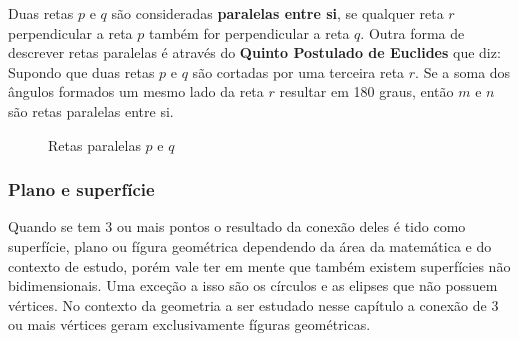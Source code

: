\begin{multicols*}{2}

    Duas retas $p$ e $q$ são consideradas \textbf{paralelas entre si}, se qualquer reta $r$ perpendicular a reta $p$ também for
    perpendicular a reta $q$. Outra forma de descrever retas paralelas é através do \textbf{Quinto Postulado de Euclides}
    que diz: Supondo que duas retas $p$ e $q$ são cortadas por uma terceira reta $r$. Se a soma dos ângulos formados um
    mesmo lado da reta $r$ resultar em 180 graus, então $m$ e $n$ são retas paralelas entre si.

    \begin{figure}[H]
        \centering
        \caption{Retas paralelas $p$ e $q$}
    \end{figure}



    \subsubsection*{Plano e superfície}
    Quando se tem 3 ou mais pontos o resultado da conexão deles é tido como superfície, plano ou fígura geométrica
    dependendo da área da matemática e do contexto de estudo, porém vale ter em mente que também existem superfícies
    não bidimensionais. Uma exceção a isso são os círculos e as elipses que não possuem vértices. No contexto da
    geometria a ser estudado nesse capítulo a conexão de 3 ou mais vértices geram exclusivamente fíguras geométricas.


\end{multicols*}
